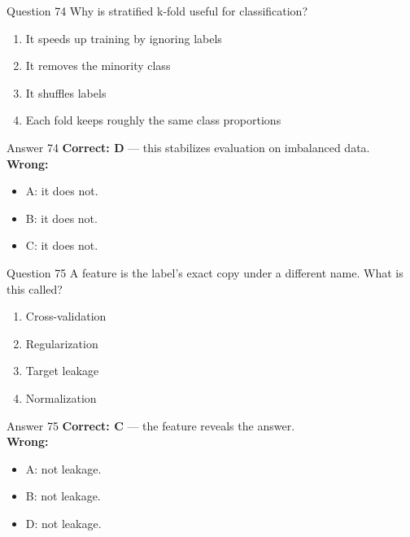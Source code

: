 \documentclass[aspectratio=169,11pt]{beamer}
\begin{document}
\begin{frame}{Question 74}
Why is stratified k-fold useful for classification?
\begin{enumerate}[label=\Alph*.]
\item It speeds up training by ignoring labels
\item It removes the minority class
\item It shuffles labels
\item Each fold keeps roughly the same class proportions
\end{enumerate}
\end{frame}
\begin{frame}{Answer 74}
\textbf{Correct: D} --- this stabilizes evaluation on imbalanced data.\\
\vspace{0.5em}
\textbf{Wrong:}
\begin{itemize}
\item A: it does not.
\item B: it does not.
\item C: it does not.
\end{itemize}
\end{frame}

\begin{frame}{Question 75}
A feature is the label's exact copy under a different name. What is this called?
\begin{enumerate}[label=\Alph*.]
\item Cross-validation
\item Regularization
\item Target leakage
\item Normalization
\end{enumerate}
\end{frame}
\begin{frame}{Answer 75}
\textbf{Correct: C} --- the feature reveals the answer.\\
\vspace{0.5em}
\textbf{Wrong:}
\begin{itemize}
\item A: not leakage.
\item B: not leakage.
\item D: not leakage.
\end{itemize}
\end{frame}
\end{document}
